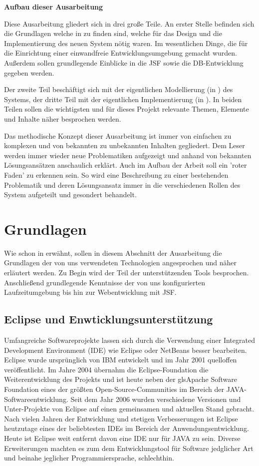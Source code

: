 \documentclass[12pt, twoside, a4paper, ngerman]{article}
\begin{document}
\textbf{Aufbau dieser Ausarbeitung}

Diese Ausarbeitung gliedert sich in drei große Teile. An erster Stelle befinden sich die Grundlagen welche in  zu finden sind, welche für das Design und die Implementierung des neuen System nötig waren.
Im wesentlichen Dinge, die für die Einrichtung einer einwandfreie Entwicklungsumgebung gemacht wurden. Außerdem sollen grundlegende Einblicke in die \ac{JSF} sowie die \ac{DB}-Entwicklung gegeben werden.

Der zweite Teil beschäftigt sich mit der eigentlichen Modellierung (in ) des Systems, der dritte Teil mit der eigentlichen Implementierung (in ). In beiden Teilen sollen die wichtigsten und für dieses Projekt relevante Themen, Elemente und Inhalte näher besprochen werden.

Das methodische Konzept dieser Ausarbeitung ist immer von einfachen zu komplexen und von bekannten zu unbekannten Inhalten gegliedert. Dem Leser werden immer wieder neue Problematiken aufgezeigt und anhand von bekannten Lösungsansätzen anschaulich erklärt. Auch im Aufbau der Arbeit soll ein 'roter Faden' zu erkennen sein. So wird eine Beschreibung zu einer bestehenden Problematik und deren Lösungsansatz immer in die verschiedenen Rollen des System aufgeteilt und gesondert behandelt.  
\newpage

\section{Grundlagen}\label{sec:Grundlagen}

Wie schon in  erwähnt, sollen in diesem Abschnitt der Ausarbeitung die Grundlagen der von uns verwendeten Technologien angesprochen und näher erläutert werden. Zu Begin wird der Teil der unterstützenden Tools besprochen. Anschließend grundlegende Kenntnisse der von uns konfigurierten Laufzeitumgebung bis hin zur Webentwicklung mit \ac{JSF}.


\subsection{Eclipse und Enwticklungsunterstützung}
Umfangreiche Softwareprojekte lassen sich durch die Verwendung einer \gls{Integrated Development Environment} (IDE) wie \gls{Eclipse} oder \gls{NetBeans} besser bearbeiten. 
Eclipse wurde ursprünglich von IBM entwickelt und im Jahr 2001 quelloffen veröffentlicht. Im Jahre 2004 übernahm die \gls{Eclipse-Foundation} die Weiterentwicklung des Projekts und ist heute neben der gls{Apache Software Foundation} eines der größten Open-Source-Communities im Bereich der JAVA-Softwareentwicklung.
Seit dem Jahr 2006 wurden verschiedene Versionen und Unter-Projekte von Eclipse auf einen gemeinsamen und aktuellen Stand gebracht.
Nach vielen Jahren der Entwicklung und stetigen Verbesserungen ist Eclipse heutzutage eines der beliebtesten IDEs im Bereich der Anwendungsentwicklung.
Heute ist Eclipse weit entfernt davon eine IDE nur für JAVA zu sein. Diverse Erweiterungen machten es zum dem Entwicklungstool für Software jedglicher Art und beinahe jeglicher Programmiersprache, schlechthin.
\end{document}
